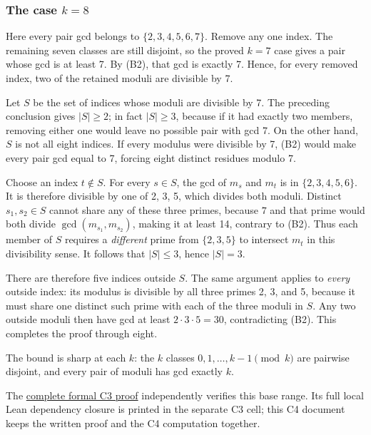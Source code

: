 \documentclass[11pt,a4paper]{article}
\begin{document}
\subsubsection{\texorpdfstring{The case \(k=8\)}{The case k=8}}\label{the-case-k8}

Here every pair gcd belongs to \(\{2,3,4,5,6,7\}\). Remove any one index. The remaining seven classes are still disjoint, so the proved \(k=7\) case gives a pair whose gcd is at least 7. By (B2), that gcd is exactly 7. Hence, for every removed index, two of the retained moduli are divisible by 7.

Let \(S\) be the set of indices whose moduli are divisible by 7. The preceding conclusion gives \(|S|\ge2\); in fact \(|S|\ge3\), because if it had exactly two members, removing either one would leave no possible pair with gcd 7. On the other hand, \(S\) is not all eight indices. If every modulus were divisible by 7, (B2) would make every pair gcd equal to 7, forcing eight distinct residues modulo 7.

Choose an index \(t\notin S\). For every \(s\in S\), the gcd of \(m_s\) and \(m_t\) is in \(\{2,3,4,5,6\}\). It is therefore divisible by one of 2, 3, 5, which divides both moduli. Distinct \(s_1,s_2\in S\) cannot share any of these three primes, because \(7\) and that prime would both divide \(\gcd(m_{s_1},m_{s_2})\), making it at least 14, contrary to (B2). Thus each member of \(S\) requires a \emph{different} prime from \(\{2,3,5\}\) to intersect \(m_t\) in this divisibility sense. It follows that \(|S|\le3\), hence \(|S|=3\).

There are therefore five indices outside \(S\). The same argument applies to \emph{every} outside index: its modulus is divisible by all three primes 2, 3, and 5, because it must share one distinct such prime with each of the three moduli in \(S\). Any two outside moduli then have gcd at least \(2\cdot3\cdot5=30\), contradicting (B2). This completes the proof through eight.

The bound is sharp at each \(k\): the \(k\) classes \(0,1,\ldots,k-1\pmod k\) are pairwise disjoint, and every pair of moduli has gcd exactly \(k\).

The \href{https://github.com/mpelteshki/climbing-to-the-frontier/blob/212bba53b1818c08c40b8c4b48f636651eaf6410/cagent/p4/lean/ProofPursuit/P4/C3.lean}{complete formal C3 proof} independently verifies this base range. Its full local Lean dependency closure is printed in the separate C3 cell; this C4 document keeps the written proof and the C4 computation together.
\end{document}
